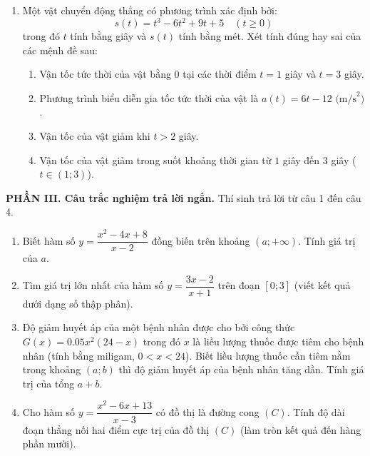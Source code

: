 \documentclass[12pt]{article}
\begin{document}
\begin{enumerate}[label=\textbf{Câu \arabic*.}, leftmargin=*]
		\item Một vật chuyển động thẳng có phương trình xác định bởi:
		\[ s(t) = t^3 - 6t^2 + 9t + 5 \quad (t \ge 0) \]
		trong đó $t$ tính bằng giây và $s(t)$ tính bằng mét. Xét tính đúng hay sai của các mệnh đề sau:
		\begin{enumerate}[label=\alph*)]
			\item Vận tốc tức thời của vật bằng $0$ tại các thời điểm $t = 1$ giây và $t = 3$ giây.
			\item Phương trình biểu diễn gia tốc tức thời của vật là $a(t) = 6t - 12 \text{ (m/s}^2\text{)}$.
			\item Vận tốc của vật giảm khi $t > 2$ giây.
			\item Vận tốc của vật giảm trong suốt khoảng thời gian từ $1$ giây đến $3$ giây ($t \in (1; 3)$).
		\end{enumerate}
		
		
	\end{enumerate}
	
	\vspace{4mm}
	\noindent\textbf{PHẦN III. Câu trắc nghiệm trả lời ngắn.} Thí sinh trả lời từ câu 1 đến câu 4.
	\vspace{2mm}
	
	
	\begin{enumerate}[label=\textbf{Câu \arabic*.}, leftmargin=*]
		
		\item Biết hàm số $y = \dfrac{x^2 - 4x + 8}{x - 2}$ đồng biến trên khoảng $(a; +\infty)$. Tính giá trị của $a$.
		
		\item Tìm giá trị lớn nhất của hàm số $y = \dfrac{3x - 2}{x + 1}$ trên đoạn $[0; 3]$ (viết kết quả dưới dạng số thập phân).
		
		\item Độ giảm huyết áp của một bệnh nhân được cho bởi công thức $G(x) = 0.05x^2(24 - x)$ trong đó $x$ là liều lượng thuốc được tiêm cho bệnh nhân (tính bằng miligam, $0 < x < 24$). Biết liều lượng thuốc cần tiêm nằm trong khoảng $(a;b)$ thì độ giảm huyết áp của bệnh nhân tăng dần. Tính giá trị của tổng $a + b$.
		
		\item Cho hàm số $y = \dfrac{x^2 - 6x + 13}{x - 3}$ có đồ thị là đường cong $(C)$. Tính độ dài đoạn thẳng nối hai điểm cực trị của đồ thị $(C)$ (làm tròn kết quả đến hàng phần mười).
		
	\end{enumerate}
	
\end{document}
